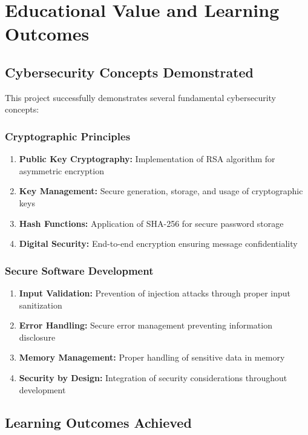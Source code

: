 \documentclass[12pt,a4paper]{article}
\begin{document}
\section{Educational Value and Learning Outcomes}

\subsection{Cybersecurity Concepts Demonstrated}

This project successfully demonstrates several fundamental cybersecurity concepts:

\subsubsection{Cryptographic Principles}

\begin{enumerate}
    \item \textbf{Public Key Cryptography:} Implementation of RSA algorithm for asymmetric encryption
    \item \textbf{Key Management:} Secure generation, storage, and usage of cryptographic keys
    \item \textbf{Hash Functions:} Application of SHA-256 for secure password storage
    \item \textbf{Digital Security:} End-to-end encryption ensuring message confidentiality
\end{enumerate}

\subsubsection{Secure Software Development}

\begin{enumerate}
    \item \textbf{Input Validation:} Prevention of injection attacks through proper input sanitization
    \item \textbf{Error Handling:} Secure error management preventing information disclosure
    \item \textbf{Memory Management:} Proper handling of sensitive data in memory
    \item \textbf{Security by Design:} Integration of security considerations throughout development
\end{enumerate}

\subsection{Learning Outcomes Achieved}
\end{document}
